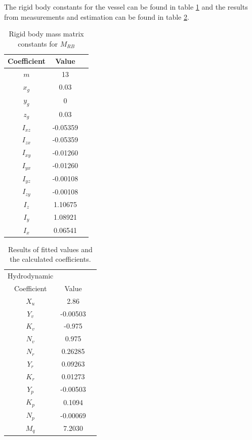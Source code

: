 The rigid body constants for the vessel can be found in table \ref{tab:constants} and the results from measurements and estimation can be found in table \ref{tab:dmatrix}.
\begin{table}[htbp]
\centering
\begin{tabular}{ccc}
	\toprule
  Coefficient & Value \\
  \midrule
  $m$ & 13 \\
  $x_g$ & 0.03 \\
  $y_g$ & 0\\
  $z_g$ & 0.03\\
  $I_{xz}$ & -0.05359 \\
  $I_{zx}$ & -0.05359 \\
  $I_{xy}$ & -0.01260 \\
  $I_{yx}$ & -0.01260 \\
  $I_{yz}$ & -0.00108 \\
  $I_{zy}$ & -0.00108 \\
  $I_z$ & 1.10675 \\
  $I_y$ & 1.08921 \\
  $I_x$ & 0.06541 \\
  \bottomrule
\end{tabular}
\caption{Rigid body mass matrix constants for $M_{RB}$}
\label{tab:constants}
\end{table}

\begin{table}[htbp]
\centering
\begin{tabular}{ccc}
	\toprule
  Hydrodynamic\\Coefficient & Value \\
  \midrule
  $X_u$ & 2.86 \\
  $Y_v$ & -0.00503 \\
  $K_v$ & -0.975 \\
  $N_v$ & 0.975 \\
  $N_r$ & 0.26285 \\
  $Y_r$ & 0.09263 \\
  $K_r$ & 0.01273 \\
  $Y_p$ & -0.00503 \\
  $K_p$ & 0.1094 \\
  $N_p$ & -0.00069 \\
  $M_q$ & 7.2030 \\
	\bottomrule
\end{tabular}
\caption{Results of fitted values and the calculated coefficients.}
\label{tab:dmatrix}
\end{table}

